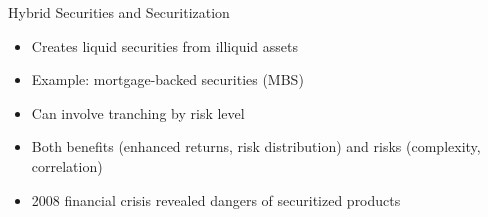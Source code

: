 \documentclass[10pt,handout]{beamer}
\begin{document}
\begin{frame}{Hybrid Securities and Securitization}
\begin{itemize}[<+->]
      \begin{itemize}
        \item Creates liquid securities from illiquid assets
        \item Example: mortgage-backed securities (MBS)
        \item Can involve tranching by risk level
        \item Both benefits (enhanced returns, risk distribution) and risks (complexity, correlation)
        \item 2008 financial crisis revealed dangers of securitized products
      \end{itemize}
  \end{itemize}
\end{frame}
\end{document}
